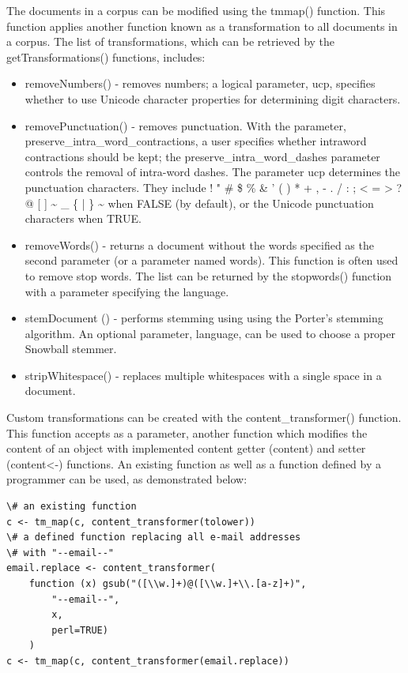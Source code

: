 \documentclass[10pt]{book}
\begin{document}
The documents in a corpus can be modified using the tmmap() function. This function applies another function known as a transformation to all documents in a corpus. The list of transformations, which can be retrieved by the getTransformations() functions, includes:

\begin{itemize}
  \item removeNumbers() - removes numbers; a logical parameter, ucp, specifies whether to use Unicode character properties for determining digit characters.
  \item removePunctuation() - removes punctuation. With the parameter, preserve\_intra\_word\_contractions, a user specifies whether intraword contractions should be kept; the preserve\_intra\_word\_dashes parameter controls the removal of intra-word dashes. The parameter ucp determines the punctuation characters. They include ! " \# \$ \% \& ' ( ) * + , - . / : ; < = > ? @ [ ] \~{} \_ \{ | \} \~{} when FALSE (by default), or the Unicode punctuation characters when TRUE.
  \item removeWords() - returns a document without the words specified as the second parameter (or a parameter named words). This function is often used to remove stop words. The list can be returned by the stopwords() function with a parameter specifying the language.
  \item stemDocument () - performs stemming using using the Porter's stemming algorithm. An optional parameter, language, can be used to choose a proper Snowball stemmer.
  \item stripWhitespace() - replaces multiple whitespaces with a single space in a document.
\end{itemize}

Custom transformations can be created with the content\_transformer() function. This function accepts as a parameter, another function which modifies the content of an object with implemented content getter (content) and setter (content<-) functions. An existing function as well as a function defined by a programmer can be used, as demonstrated below:

\begin{verbatim}
\# an existing function
c <- tm_map(c, content_transformer(tolower))
\# a defined function replacing all e-mail addresses
\# with "--email--"
email.replace <- content_transformer(
    function (x) gsub("([\\w.]+)@([\\w.]+\\.[a-z]+)",
        "--email--",
        x,
        perl=TRUE)
    )
c <- tm_map(c, content_transformer(email.replace))
\end{verbatim}
\end{document}
